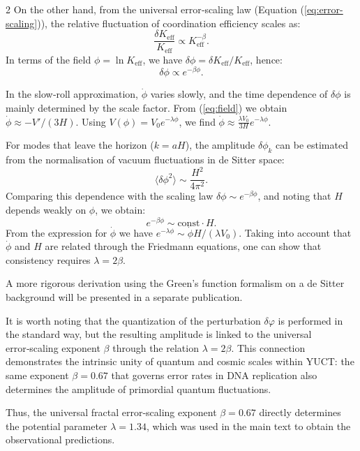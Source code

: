 \documentclass[12pt,a4paper]{article}
\newcommand{\Keff}{K_{\mathrm{eff}}}
\begin{document}
\begin{multicols}{2}
		On the other hand, from the universal error‑scaling law (Equation (\ref{eq:error-scaling})), the relative fluctuation of coordination efficiency scales as:
		\begin{equation}
			\frac{\delta\Keff}{\Keff} \propto \Keff^{-\beta}.
		\end{equation}
		In terms of the field \(\phi = \ln\Keff\), we have \(\delta\phi = \delta\Keff/\Keff\), hence:
		\begin{equation}
			\delta\phi \propto e^{-\beta\phi}.
		\end{equation}
		
		In the slow‑roll approximation, \(\dot{\phi}\) varies slowly, and the time dependence of \(\delta\phi\) is mainly determined by the scale factor. From (\ref{eq:field}) we obtain \(\dot{\phi} \approx -V'/(3H)\). Using \(V(\phi) = V_0 e^{-\lambda\phi}\), we find \(\dot{\phi} \approx \frac{\lambda V_0}{3H} e^{-\lambda\phi}\).
		
		For modes that leave the horizon (\(k = aH\)), the amplitude \(\delta\phi_k\) can be estimated from the normalisation of vacuum fluctuations in de Sitter space:
		\begin{equation}
			\langle \delta\phi^2 \rangle \sim \frac{H^2}{4\pi^2}.
		\end{equation}
		Comparing this dependence with the scaling law \(\delta\phi \sim e^{-\beta\phi}\), and noting that \(H\) depends weakly on \(\phi\), we obtain:
		\begin{equation}
			e^{-\beta\phi} \sim \text{const} \cdot H.
		\end{equation}
		From the expression for \(\dot{\phi}\) we have \(e^{-\lambda\phi} \sim \dot{\phi} H / (\lambda V_0)\). Taking into account that \(\dot{\phi}\) and \(H\) are related through the Friedmann equations, one can show that consistency requires \(\lambda = 2\beta\).
		
		A more rigorous derivation using the Green's function formalism on a de Sitter background will be presented in a separate publication.
		
		It is worth noting that the quantization of the perturbation \(\delta\varphi\) is performed in the standard way, but the resulting amplitude is linked to the universal error‑scaling exponent \(\beta\) through the relation \(\lambda = 2\beta\). This connection demonstrates the intrinsic unity of quantum and cosmic scales within YUCT: the same exponent \(\beta = 0.67\) that governs error rates in DNA replication also determines the amplitude of primordial quantum fluctuations.
		
		Thus, the universal fractal error‑scaling exponent \(\beta = 0.67\) directly determines the potential parameter \(\lambda = 1.34\), which was used in the main text to obtain the observational predictions.
	\end{multicols}
	
\end{document}
